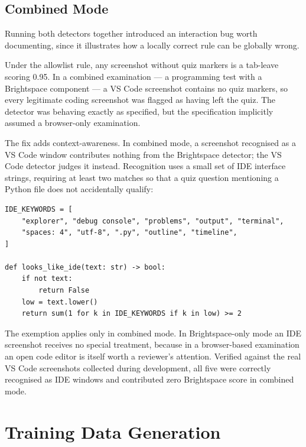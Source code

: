 \documentclass[12pt,oneside]{report}
\begin{document}
\section{Combined Mode}
\label{sec:combined}

Running both detectors together introduced an interaction bug worth
documenting, since it illustrates how a locally correct rule can be globally
wrong.

Under the allowlist rule, any screenshot without quiz markers is a tab-leave
scoring 0.95. In a combined examination --- a programming test with a
Brightspace component --- a VS Code screenshot contains no quiz markers, so
every legitimate coding screenshot was flagged as having left the quiz. The
detector was behaving exactly as specified, but the specification implicitly
assumed a browser-only examination.

The fix adds context-awareness. In combined mode, a screenshot recognised as a
VS Code window contributes nothing from the Brightspace detector; the VS Code
detector judges it instead. Recognition uses a small set of IDE interface
strings, requiring at least two matches so that a quiz question mentioning a
Python file does not accidentally qualify:

\begin{lstlisting}[caption={IDE recognition used to resolve the cross-detector conflict.}]
IDE_KEYWORDS = [
    "explorer", "debug console", "problems", "output", "terminal",
    "spaces: 4", "utf-8", ".py", "outline", "timeline",
]

def looks_like_ide(text: str) -> bool:
    if not text:
        return False
    low = text.lower()
    return sum(1 for k in IDE_KEYWORDS if k in low) >= 2
\end{lstlisting}

The exemption applies only in combined mode. In Brightspace-only mode an IDE
screenshot receives no special treatment, because in a browser-based
examination an open code editor is itself worth a reviewer's attention.
Verified against the real VS Code screenshots collected during development, all
five were correctly recognised as IDE windows and contributed zero Brightspace
score in combined mode.

\chapter{Training Data Generation}
\label{ch:data}
\end{document}
